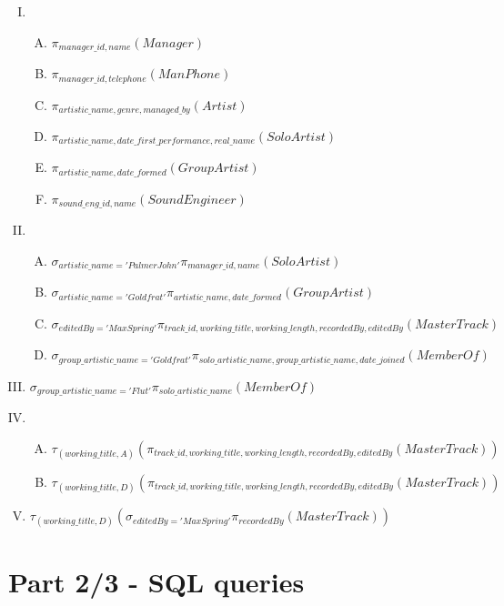 \documentclass[11pt,a4paper]{article}
\newcommand{\includesqloutput}[1]{\tiny  \normalsize}
\begin{document}
\begin{enumerate}[I.]
\item
  \begin{enumerate}[A. ]
				\item $\pi_{manager\_id,name}(Manager)$
				\item $\pi_{manager\_id,telephone}(ManPhone)$
				\item $\pi_{artistic\_name,genre,managed\_by}(Artist)$
				\item $\pi_{artistic\_name,date\_first\_performance,real\_name}(SoloArtist)$
				\item $\pi_{artistic\_name,date\_formed}(GroupArtist)$
				\item $\pi_{sound\_eng\_id,name}(SoundEngineer)$
  \end{enumerate}
\item
  \begin{enumerate}[A. ]
				\item $\sigma_{artistic\_name='Palmer John'} \pi_{manager\_id,name}(SoloArtist)$
				\item $\sigma_{artistic\_name='Goldfrat'} \pi_{artistic\_name,date\_formed} (GroupArtist)$
				\item $\sigma_{editedBy='Max Spring'} \pi_{track\_id, working\_title,working\_length,recordedBy,editedBy} (MasterTrack)$
				\item $\sigma_{group\_artistic\_name='Goldfrat'} \pi_{solo\_artistic\_name, group\_artistic\_name, date\_joined}(MemberOf)$
  \end{enumerate}
\item $\sigma_{group\_artistic\_name='Flut'} \pi_{solo\_artistic\_name} (MemberOf)$
\item
	\begin{enumerate}[A.]
				\item $\tau_{(working\_title,A)}(\pi_{track\_id, working\_title,working\_length,recordedBy,editedBy}(MasterTrack))$
				\item $\tau_{(working\_title,D)}(\pi_{track\_id, working\_title,working\_length,recordedBy,editedBy}(MasterTrack))$
	\end{enumerate}
\item $\tau_{(working\_title,D)} (\sigma_{editedBy='Max Spring'} \pi_{recordedBy} (MasterTrack))$
\end{enumerate}


\section{Part 2/3 - SQL queries}

\includesqloutput{sqlOutputs/LabEx4Out.lst}
\end{document}
